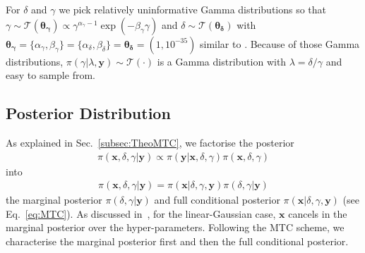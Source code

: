 \documentclass{article}
\begin{document}
For $\delta$ and $\gamma$ we pick relatively uninformative Gamma distributions so that \linebreak$\gamma \sim \mathcal{T}(\bm{\theta_{\gamma}}) \propto \gamma^{\alpha_\gamma -1 } \exp{( -\beta_\gamma \gamma) } $ and $\delta \sim \mathcal{T}(\bm{\theta_{\delta}})$ with $\bm{\theta_{\gamma}} = \{  \alpha_\gamma, \beta_\gamma\}  = \{ \alpha_\delta ,\beta_\delta\} = \bm{\theta_{\delta}} = (1,10^{-35})$ similar to \cite{fox2016fast}.
Because of those Gamma distributions, $\pi(\gamma | \lambda, \bm{y}) \sim \mathcal{T}(\cdot)$ is a Gamma distribution with $\lambda = \delta / \gamma $ and easy to sample from.


\subsection{Posterior Distribution}
\label{sec:FirstO3Post}
As explained in Sec.~\ref{subsec:TheoMTC}, we factorise the posterior
\begin{align}
	\pi( \bm{x}, \delta, \gamma| \bm{y}) \propto \pi(\bm{y}| \bm{x},\delta,\gamma) \pi( \bm{x},  \delta,\gamma)
\end{align}
into 
\begin{align}
	\pi( \bm{x},  \delta,\gamma| \bm{y}) =\pi( \bm{x}| \delta,\gamma, \bm{y})\pi( \delta,\gamma | \bm{y})
\end{align}
the marginal posterior $\pi(\delta ,\gamma| \bm{y})$ and full conditional posterior $\pi( \bm{x}| \delta,\gamma, \bm{y})$ (see Eq.~\ref{eq:MTC}).
As discussed in~\cite{fox2016fast}, for the linear-Gaussian case, $\bm{x}$ cancels in the marginal posterior over the hyper-parameters.
Following the MTC scheme, we characterise the marginal posterior first and then the full conditional posterior.
\end{document}
